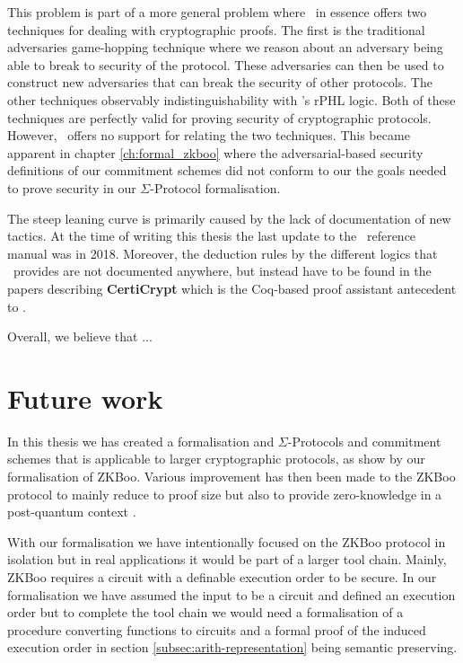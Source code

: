 This problem is part of a more general problem where \easycrypt\ in essence
offers two techniques for dealing with cryptographic proofs. The first is the
traditional adversaries game-hopping technique where we reason about an
adversary being able to break to security of the protocol. These adversaries can
then be used to construct new adversaries that can break the security of other protocols.
The other techniques observably indistinguishability with \easycrypt's rPHL
logic.
Both of these techniques are perfectly valid for proving security of
cryptographic protocols. However, \easycrypt\ offers no support for relating the
two techniques. This became apparent in chapter \ref{ch:formal_zkboo} where the
adversarial-based security definitions of our commitment schemes did not conform
to our the goals needed to prove security in our $\Sigma$-Protocol formalisation.

The steep leaning curve is primarily caused by the lack of documentation of new
tactics. At the time of writing this thesis the last update to the \easycrypt\
reference manual \cite{ec_refman} was in 2018. Moreover, the deduction rules by
the different logics that \easycrypt\ provides are not documented anywhere, but
instead have to be found in the papers describing \textbf{CertiCrypt} which is
the Coq-based proof assistant antecedent to \easycrypt.

Overall, we believe that ...

\section{Future work}
\label{sec:future_work}
In this thesis we has created a formalisation and $\Sigma$-Protocols and
commitment schemes that is applicable to larger cryptographic protocols, as show
by our formalisation of ZKBoo. Various improvement has then been made to the
ZKBoo protocol to mainly reduce to proof size but also to provide zero-knowledge
in a post-quantum context \cite{zkb++}.

With our formalisation we have intentionally focused on the ZKBoo protocol in
isolation but in real applications it would be part of a larger tool chain.
Mainly, ZKBoo requires a circuit with a definable execution order to be secure.
In our formalisation we have assumed the input to be a circuit and defined an
execution order but to complete the tool chain we would need a formalisation of
a procedure converting functions to circuits and a formal proof of the induced
execution order in section \ref{subsec:arith-representation} being semantic preserving.

